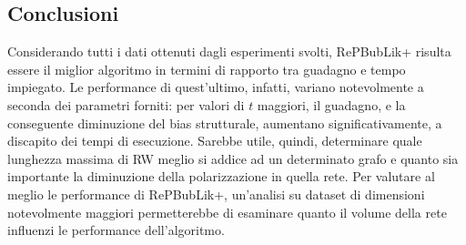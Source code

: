\subsection{Conclusioni}
Considerando tutti i dati ottenuti dagli esperimenti svolti, RePBubLik+ risulta essere il miglior algoritmo in termini di rapporto tra guadagno e tempo impiegato.
Le performance di quest'ultimo, infatti, variano notevolmente a seconda dei parametri forniti: per valori di $t$ maggiori, 
il guadagno, e la conseguente diminuzione del bias strutturale, aumentano significativamente, a discapito dei tempi di esecuzione. 
Sarebbe utile, quindi, determinare quale lunghezza massima di RW meglio si addice ad un determinato grafo e quanto sia importante la diminuzione della polarizzazione in quella rete.
Per valutare al meglio le performance di RePBubLik+, un'analisi su dataset di dimensioni notevolmente maggiori permetterebbe di esaminare quanto il volume della rete
influenzi le performance dell'algoritmo. 



